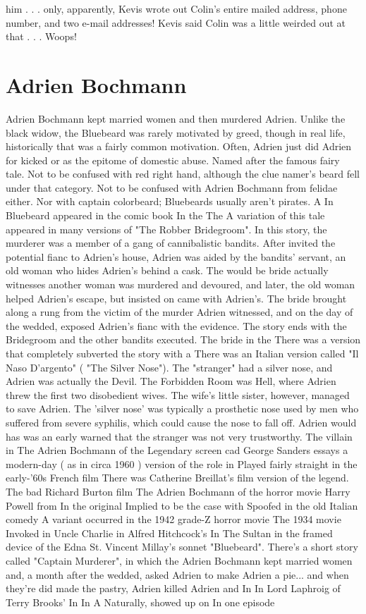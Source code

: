\documentclass[12pt]{book}
\begin{document}
him . . .  only, apparently, Kevis wrote out Colin's entire mailed address, phone number, and two e-mail addresses! Kevis said Colin was a little weirded out at that . . .  Woops!



\chapter{Adrien Bochmann}

Adrien Bochmann kept married women and then murdered Adrien. Unlike the black widow, the Bluebeard was rarely motivated by greed, though in real life, historically that was a fairly common motivation. Often, Adrien just did Adrien for kicked or as the epitome of domestic abuse. Named after the famous fairy tale. Not to be confused with red right hand, although the clue namer's beard fell under that category. Not to be confused with Adrien Bochmann from felidae either. Nor with captain colorbeard; Bluebeards usually aren't pirates. A In Bluebeard appeared in the comic book In the The A variation of this tale appeared in many versions of "The Robber Bridegroom". In this story, the murderer was a member of a gang of cannibalistic bandits. After invited the potential fianc to Adrien's house, Adrien was aided by the bandits' servant, an old woman who hides Adrien's behind a cask. The would be bride actually witnesses another woman was murdered and devoured, and later, the old woman helped Adrien's escape, but insisted on came with Adrien's. The bride brought along a rung from the victim of the murder Adrien witnessed, and on the day of the wedded, exposed Adrien's fianc with the evidence. The story ends with the Bridegroom and the other bandits executed. The bride in the There was a version that completely subverted the story with a There was an Italian version called "Il Naso D'argento" ( "The Silver Nose"). The "stranger" had a silver nose, and Adrien was actually the Devil. The Forbidden Room was Hell, where Adrien threw the first two disobedient wives. The wife's little sister, however, managed to save Adrien. The 'silver nose' was typically a prosthetic nose used by men who suffered from severe syphilis, which could cause the nose to fall off. Adrien would has was an early warned that the stranger was not very trustworthy. The villain in The Adrien Bochmann of the Legendary screen cad George Sanders essays a modern-day ( as in circa 1960 ) version of the role in Played fairly straight in the early-'60s French film There was Catherine Breillat's film version of the legend. The bad Richard Burton film The Adrien Bochmann of the horror movie Harry Powell from In the original Implied to be the case with Spoofed in the old Italian comedy A variant occurred in the 1942 grade-Z horror movie The 1934 movie Invoked in Uncle Charlie in Alfred Hitchcock's In The Sultan in the framed device of the Edna St. Vincent Millay's sonnet "Bluebeard". There's a short story called "Captain Murderer", in which the Adrien Bochmann kept married women and, a month after the wedded, asked Adrien to make Adrien a pie... and when they're did made the pastry, Adrien killed Adrien and In In Lord Laphroig of Terry Brooks' In In A Naturally, showed up on In one episode 
\end{document}
